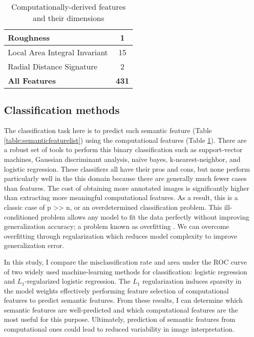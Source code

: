 \begin{table}
\begin{tabular}{|l|c|}
		\hspace{2pt} Roughness & 1\\ \hline
		\hspace{2pt} Local Area Integral Invariant & 15\\ \hline
		\hspace{2pt} Radial Distance Signature & 2\\ \hline \hline
		\textbf{All Features} & \textbf{431} \\ \hline
	\end{tabular}
	\caption{Computationally-derived features and their dimensions}
	\label{table:compfeaturelist}
\end{table}

\subsection{Classification methods}
The classification task here is to predict each semantic feature (Table \ref{table:semanticfeaturelist}) using the computational features (Table \ref{table:compfeaturelist}).
There are a robust set of tools to perform this binary classification such as support-vector machines, Gaussian discriminant analysis, na\"{i}ve bayes, k-nearest-neighbor, and logistic regression. These classifiers all have their pros and cons, but none perform particularly well in the this domain because there are generally much fewer cases than features. The cost of obtaining more annotated images is significantly higher than extracting more meaningful computational features. As a result, this is a classic case of p >> n, or an overdetermined classification problem. This ill-conditioned problem allows any model to fit the data perfectly without improving generalization accuracy; a problem known as overfitting \cite{Hastie:2009wp,Friedman:2009wm}. We can overcome overfitting through regularization which reduces model complexity to improve generalization error. 

In this study, I compare the misclassification rate and area under the ROC curve of two widely used machine-learning methods for classification: logistic regression and $L_1$-regularized logistic regression. The $L_1$ regularization induces sparsity in the model weights effectively performing feature selection of computational features to predict semantic features. From these results, I can determine which semantic features are well-predicted and which computational features are the most useful for this purpose. Ultimately, prediction of semantic features from computational ones could lead to reduced variability in image interpretation.


